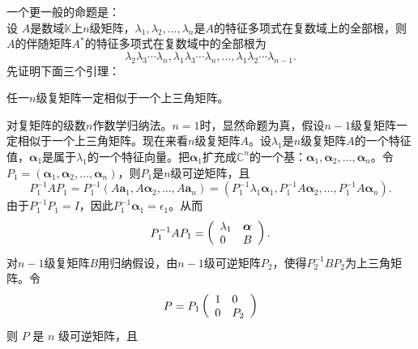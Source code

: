 \begin{enumerate}[1~]
\begin{enumerate}[1.~]
\begin{remark}
一个更一般的命题是：\\
设 $A$是数域$\mathbb{K}$上$n$级矩阵，$\lambda_1, \lambda_2, \dots,\lambda_n$是$A$的特征多项式在复数域上的全部根，则$A$的伴随矩阵$A^*$的特征多项式在复数域中的全部根为\[
\lambda _ { 2 } \lambda _ { 3 } \cdots \lambda _ { n } ,  \lambda _ { 1 } \lambda _ { 3 } \cdots \lambda _ { n } ,  \dots ,  \lambda _ { 1 } \lambda _ { 2 } \cdots \lambda _ { n - 1 }. \]
先证明下面三个引理：
\begin{lemma}\label{fujuzhenxiangsiyuduijiaozhen}
任一$n$级复矩阵一定相似于一个上三角矩阵。
\end{lemma}
\begin{subproof}
对复矩阵的级数$n$作数学归纳法。$n=1$时，显然命题为真，假设$n-1$级复矩阵一定相似于一个上三角矩阵。现在来看$n$级复矩阵$A$。设$\lambda_1$是$n$级复矩阵$A$的一个特征值，$\boldsymbol{\alpha}_1$是属于$\lambda_1$的一个特征向量。把$\boldsymbol{\alpha}_1$扩充成$\mathbb{C}^n$的一个基：$\boldsymbol{\alpha}_1, \boldsymbol{\alpha}_2, \dots, \boldsymbol{\alpha}_n$。令$P_1 = \left(\boldsymbol{\alpha}_1, \boldsymbol{\alpha}_2, \dots, \boldsymbol{\alpha}_n \right)$，则$P_1$是$n$级可逆矩阵，且\[
P _ { 1 } ^ { - 1 } A P _ { 1 } = P _ { 1 } ^ { - 1 } \left( A \boldsymbol { a } _ { 1 } , A \boldsymbol { \boldsymbol{\alpha} } _ { 2 } , \dots , A \boldsymbol { a } _ { n } \right) = \left( P _ { 1 } ^ { - 1 } \lambda _ { 1 } \boldsymbol { \boldsymbol{\alpha} } _ { 1 } , P _ { 1 } ^ { - 1 } A \boldsymbol { \boldsymbol{\alpha} } _ { 2 } , \dots , P _ { 1 } ^ { - 1 } A \boldsymbol { \boldsymbol{\alpha} } _ { n } \right). \]
由于$P_1^{-1}P_1 = I$，因此$P_1^{-1} \boldsymbol{\alpha}_1 =\epsilon_1$。从而\[
P _ { 1 } ^ { - 1 } A P _ { 1 } = \left( \begin{array} { l l } { \lambda _ { 1 } } & { \boldsymbol{\alpha} } \\ { 0 } & { B } \end{array} \right). \]
对$n-1$级复矩阵$B$用归纳假设，由$n-1$级可逆矩阵$P_2$，使得$P_2^{-1}BP_2$为上三角矩阵。令\[
P = P _ { 1 } \left( \begin{array} { l l } { 1 } & { 0 } \\ { 0 } & { P _ { 2 } } \end{array} \right) \]
则 $P$ 是 $n$ 级可逆矩阵，且\[
\]
\end{subproof}
\end{remark}
\end{enumerate}
\end{enumerate}
